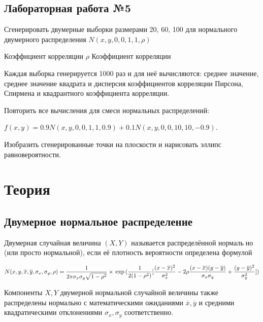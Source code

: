 \documentclass[a4paper]{article}
\begin{document}
    \subsection{Лабораторная работа №5}
    Сгенерировать двумерные выборки размерами 20, 60, 100 для нормального двумерного распределения $N(x, y, 0, 0, 1, 1, \rho)$

    Коэффициент корреляции $\rho$ Коэффициент корреляции


    Каждая выборка генерируется 1000 раз и для неё вычисляются: среднее значение, среднее значение квадрата и дисперсия коэффициентов
корреляции Пирсона, Спирмена и квадрантного коэффициента корреляции.

    Повторить все вычисления для смеси нормальных распределений:
 
    \begin{center}
        $f(x, y) = 0.9N(x, y, 0, 0, 1, 1, 0.9) + 0.1N(x, y, 0, 0, 10, 10, -0.9)$.\\
    \end{center}
    
    Изобразить сгенерированные точки на плоскости и нарисовать эллипс
равновероятности.

 
\section{Теория}

    \subsection{Двумерное нормальное распределение}
    
        Двумерная случайная величина $(X, Y)$ называется распределённой нормально (или просто нормальной), если её плотность вероятности определена
формулой

        \begin{equation} \label{double_norm_distr}
            N(x, y, \overline{x}, \overline{y}, \sigma_x, \sigma_y, \rho) = \dfrac{1}{2 \pi \sigma_x \sigma_y \sqrt{1 - \rho^2}} \times \\
            \exp{(\dfrac{1}{2(1 - \rho^2)}[\dfrac{(x - \overline{x})^2}{\sigma^2_x} - 2 \rho \dfrac{(x - \overline{x})(y - \overline{y})}{\sigma_x \sigma_y} + \dfrac{(y - \overline{y})^2}{\sigma^2_y}])}
        \end{equation}
        
        Компоненты $X, Y$ двумерной нормальной случайной величины также распределены нормально с математическими ожиданиями $\overline{x}, \overline{y}$ и средними квадратическими отклонениями $\sigma_x, \sigma_y$ соответственно.
        
\end{document}
